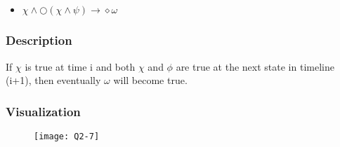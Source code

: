 \newpage
\subsection{}


\begin{itemize}
   \item[] $\chi \land \bigcirc (\chi \land \psi) \rightarrow \diamond \omega$
\end{itemize}

\subsubsection{Description}
If $\chi$ is true at time i and both $\chi$ and $\phi$ are true at the next state in timeline (i+1), then eventually $\omega$ will become true.

\subsubsection{Visualization}

\begin{figure}[h!]
	\centering \texttt{[image: Q2-7]}
\end{figure}